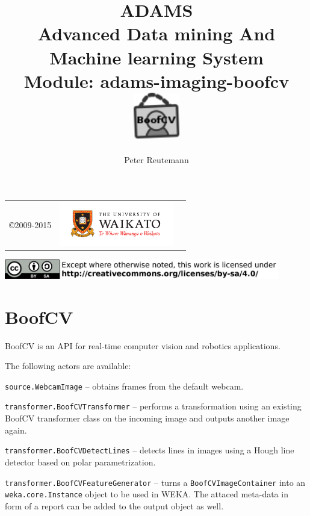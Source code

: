 \documentclass[a4paper]{book}
\title{
  \textbf{ADAMS} \\
  {\Large \textbf{A}dvanced \textbf{D}ata mining \textbf{A}nd \textbf{M}achine
  learning \textbf{S}ystem} \\
  {\Large Module: adams-imaging-boofcv} \\
  \vspace{1cm}
  \includegraphics[width=2cm]{images/imaging-boofcv-module.png} \\
}
\author{
  Peter Reutemann
}
\begin{document}
\begin{titlepage}
\maketitle

\thispagestyle{empty}
\center
\begin{table}[b]
	\begin{tabular}{c l l}
		\parbox[c][2cm]{2cm}{\copyright 2009-2015} &
		\parbox[c][2cm]{5cm}{\includegraphics[width=5cm]{images/coat_of_arms.pdf}} \\
	\end{tabular}
	\includegraphics[width=12cm]{images/cc.png} \\
\end{table}

\end{titlepage}

\tableofcontents

\chapter{BoofCV}
BoofCV is an API for real-time computer vision and robotics applications\cite{boofcv}.

The following actors are available:
\begin{tight_itemize}
	\item \texttt{source.WebcamImage} -- obtains frames from the default webcam.
	\item \texttt{transformer.BoofCVTransformer} -- performs a transformation
	using an existing BoofCV transformer class on the incoming image and
	outputs another image again.
	\item \texttt{transformer.BoofCVDetectLines} -- detects lines in images
	using a Hough line detector based on polar parametrization.
	\item \texttt{transformer.BoofCVFeatureGenerator} -- turns a
	\texttt{BoofCVImageContainer} into an \texttt{weka.core.Instance} object to
	be used in WEKA. The attaced meta-data in form of a report can be added to the
	output object as well.
\end{tight_itemize}
\end{document}
